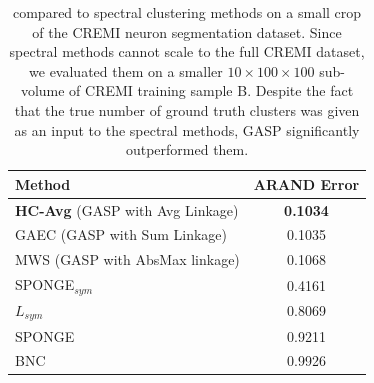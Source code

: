 \begin{table}[t]
\centering
\begin{tabular}[t]{l c}
           Method & ARAND Error \\ \midrule
           \textbf{HC-Avg} (GASP with Avg Linkage) & \textbf{0.1034} \\
GAEC \cite{keuper2015efficient} (GASP with Sum Linkage) & 0.1035 \\
MWS \cite{wolf2018mutex} (GASP with AbsMax linkage) & 0.1068 \\
SPONGE$_{sym}$ \cite{Cucuringu2019SPONGEAG} & 0.4161\\
$L_{sym}$ \cite{kunegis2010spectral} & 0.8069 \\
SPONGE \cite{Cucuringu2019SPONGEAG} & 0.9211 \\
BNC \cite{chiang2012scalable} & 0.9926 \\
        \end{tabular}
    \caption{\algname{} compared to spectral clustering methods on a small crop of the CREMI neuron segmentation dataset. 
    Since spectral methods cannot scale to the full CREMI dataset, we evaluated them on a smaller $10\times100\times100$ sub-volume of CREMI training sample B.
    Despite the fact that the true number of ground truth clusters was given as an input to the spectral methods, GASP significantly outperformed them. 
    }
    \label{tab:cremi_spectral_experiments}
\end{table}


